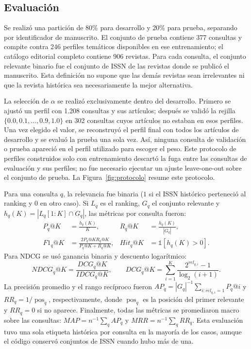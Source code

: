 \documentclass[12pt,a4paper]{article}
\begin{document}
\subsection{Evaluación}
Se realizó una partición de 80\% para desarrollo y 20\% para prueba, separando por identificador de manuscrito. El conjunto de prueba contiene 377 consultas y compite contra 246 perfiles temáticos disponibles en ese entrenamiento; el catálogo editorial completo contiene 906 revistas. Para cada consulta, el conjunto relevante binario fue el conjunto de ISSN de las revistas donde se publicó el manuscrito. Esta definición no supone que las demás revistas sean irrelevantes ni que la revista histórica sea necesariamente la mejor alternativa.

La selección de $\alpha$ se realizó exclusivamente dentro del desarrollo. Primero se ajustó un perfil con 1.208 consultas y sus artículos; después se validó la rejilla $\{0.0,0.1,\ldots,0.9,1.0\}$ en 302 consultas cuyos artículos no estaban en esos perfiles. Una vez elegido el valor, se reconstruyó el perfil final con todos los artículos de desarrollo y se evaluó la prueba una sola vez. Así, ninguna consulta de validación o prueba apareció en el perfil utilizado para escoger el peso. Este protocolo de perfiles construidos solo con entrenamiento descartó la fuga entre las consultas de evaluación y sus perfiles; no fue necesario ejecutar un ajuste leave-one-out sobre el conjunto de prueba. La Figura~\ref{fig:protocolo} resume este protocolo.

Para una consulta $q$, la relevancia fue binaria ($1$ si el ISSN histórico perteneció al ranking y $0$ en otro caso). Si $L_q$ es el ranking, $G_q$ el conjunto relevante y $h_q(K)=|L_q[1:K]\cap G_q|$, las métricas por consulta fueron:
\begin{align}
P_q@K &= \frac{h_q(K)}{K}, & R_q@K &= \frac{h_q(K)}{|G_q|}, \\
F1_q@K &= \frac{2P_q@K R_q@K}{P_q@K+R_q@K}, & Hit_q@K &= \mathbb{1}[h_q(K)>0].
\end{align}
Para NDCG se usó ganancia binaria y descuento logarítmico:
\begin{equation}
NDCG_q@K=\frac{DCG_q@K}{IDCG_q@K},\qquad DCG_q@K=\sum_{i=1}^{K}\frac{2^{rel_{q,i}}-1}{\log_2(i+1)}.
\end{equation}
La precisión promedio y el rango recíproco fueron $AP_q=|G_q|^{-1}\sum_{i:rel_{q,i}=1}P_q@i$ y $RR_q=1/\operatorname{pos}_q$, respectivamente, donde $\operatorname{pos}_q$ es la posición del primer relevante y $RR_q=0$ si no aparece. Finalmente, todas las métricas se promediaron macro sobre las consultas: $MAP=n^{-1}\sum_q AP_q$ y $MRR=n^{-1}\sum_q RR_q$. Esta evaluación tuvo una sola etiqueta histórica por consulta en la mayoría de los casos, aunque el código conservó conjuntos de ISSN cuando hubo más de una.
\end{document}
